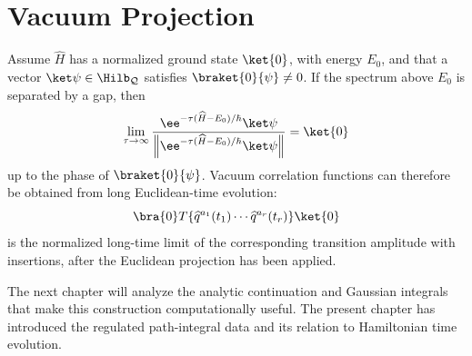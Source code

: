 \section{Vacuum Projection}

Assume \(\widehat H\) has a normalized ground state \(\ket{0}\), with energy
\(E_0\), and that a vector \(\ket\psi\in\Hilb_{\mathcal Q}\) satisfies
\(\braket{0}{\psi}\ne0\). If the spectrum above \(E_0\) is separated by a
gap, then
\[
  \lim_{\tau\to\infty}
  \frac{\ee^{-\tau(\widehat H-E_0)/\hbar}\ket\psi}
       {\left\|\ee^{-\tau(\widehat H-E_0)/\hbar}\ket\psi\right\|}
  =
  \ket{0}
\]
up to the phase of \(\braket{0}{\psi}\). Vacuum correlation functions can
therefore be obtained from long Euclidean-time evolution:
\[
  \bra{0}T\{\widehat q^{a_1}(t_1)\cdots
  \widehat q^{a_r}(t_r)\}\ket{0}
\]
is the normalized long-time limit of the corresponding transition amplitude
with insertions, after the Euclidean projection has been applied.

The next chapter will analyze the analytic continuation and Gaussian
integrals that make this construction computationally useful. The present
chapter has introduced the regulated path-integral data and its relation to
Hamiltonian time evolution.
